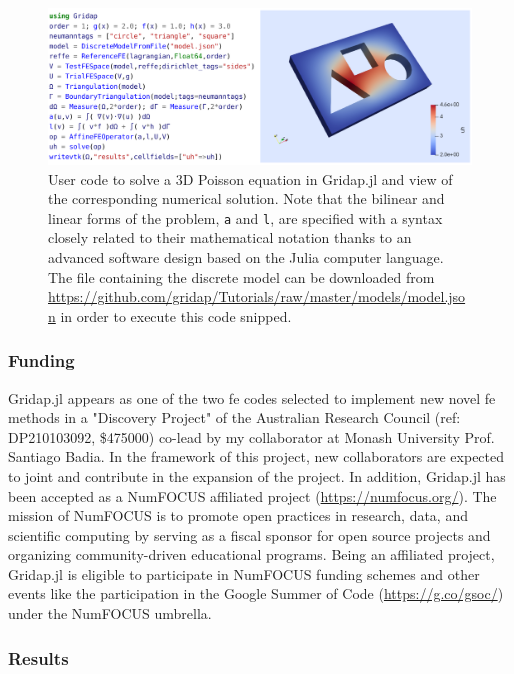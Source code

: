 \documentclass{article}
\begin{document}
\begin{figure}[ht!]
\includegraphics[width=\textwidth]{../_assets/fig11.png}
\caption{User code to solve a 3D Poisson equation in Gridap.jl and view of the corresponding numerical solution. Note that the bilinear and linear forms of the problem, \texttt{a} and \texttt{l}, are specified with a syntax closely related to their mathematical notation thanks to an advanced software design based on the Julia computer language. The file containing the discrete model can be downloaded from \url{https://github.com/gridap/Tutorials/raw/master/models/model.json} in order to execute this code snipped.} 
\label{fig:gridap-code}
\end{figure}

\subsubsection{Funding}

Gridap.jl appears as one of the two  \ac{fe} codes selected to implement new novel \ac{fe} methods in a { "Discovery Project" of the Australian Research Council} (ref: DP210103092, \$475000) co-lead by my collaborator at Monash University Prof. Santiago Badia. In the framework of this project, new collaborators are expected to joint and contribute in the expansion of the project. In addition, Gridap.jl has been accepted as a {NumFOCUS affiliated project} (\url{https://numfocus.org/}). The mission of NumFOCUS is to promote open practices in research, data, and scientific computing by serving as a fiscal sponsor for open source projects and organizing community-driven educational programs. Being an affiliated project, Gridap.jl is eligible to participate in NumFOCUS funding schemes and other events like the participation in the Google Summer of Code (\url{https://g.co/gsoc/}) under the NumFOCUS umbrella.

\subsubsection{Results}
\end{document}
